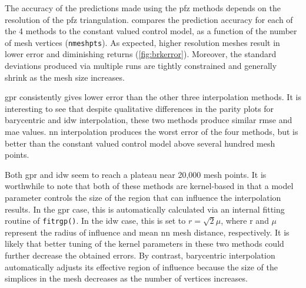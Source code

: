 \documentclass[preprint,12pt]{elsarticle}
\begin{document}
The accuracy of the predictions made using the \gls{pfz} methods depends on the resolution of the \gls{pfz} triangulation.  compares the prediction accuracy for each of the 4 methods to the constant valued control model, as a function of the number of mesh vertices (\texttt{nmeshpts}). As expected, higher resolution meshes result in lower error and diminishing returns (\cref{fig:brkerror}). Moreover, the standard deviations produced via multiple runs are tightly constrained and generally shrink as the mesh size increases. 

\Gls{gpr} consistently gives lower error than the other three interpolation methods. It is interesting to see that despite qualitative differences in the parity plots for barycentric and \gls{idw} interpolation, these two methods produce similar \gls{rmse} and \gls{mae} values. \Gls{nn} interpolation produces the worst error of the four methods, but is better than the constant valued control model above several hundred mesh points. 

Both \gls{gpr} and \gls{idw} seem to reach a plateau near 20,000 mesh points. It is worthwhile to note that both of these methods are kernel-based in that a model parameter controls the size of the region that can influence the interpolation results. In the \gls{gpr} case, this is automatically calculated via an internal fitting routine of \texttt{fitrgp()}. In the \gls{idw} case, this is set to $r=\sqrt{2} \mu$, where r and $\mu$ represent the radius of influence and mean \gls{nn} mesh distance, respectively. It is likely that better tuning of the kernel parameters in these two methods could further decrease the obtained errors. By contrast, barycentric interpolation automatically adjusts its effective region of influence because the size of the simplices in the mesh decreases as the number of vertices increases.

\end{document}

